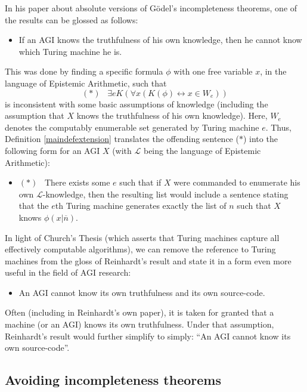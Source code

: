 \documentclass[runningheads]{llncs}
\begin{document}
In his paper \cite{reinhardt1986epistemic} about absolute versions of
G\"odel's incompleteness theorems, one of the results can be glossed as follows:
\begin{itemize}
  \item
  If an AGI knows the truthfulness of his own knowledge, then he cannot
  know which Turing machine he is.
\end{itemize}
This was done by finding a specific formula $\phi$ with one free variable $x$,
in the language of Epistemic Arithmetic,
such that
\[
  (*) \,\,\,\,\, \exists e K(\forall x (K(\phi)\leftrightarrow x\in W_e))
\]
is inconsistent with some basic assumptions of knowledge
(including the assumption that $X$ knows the truthfulness of his own knowledge).
Here, $W_e$ denotes the computably enumerable set generated by Turing machine $e$. Thus,
Definition \ref{maindefextension} translates the offending sentence ($*$) into the
following form
for an AGI $X$ (with $\mathscr L$ being the language of Epistemic Arithmetic):
\begin{itemize}
  \item
  $(*) \,\,\,\,\, $There exists some $e$ such that if $X$ were commanded to enumerate his own
  $\mathscr L$-knowledge, then the resulting list would include a sentence
  stating that the $e$th Turing machine generates exactly the list of $n$ such
  that $X$ knows $\phi(x|\overline n)$.
\end{itemize}

In light of Church's Thesis (which asserts that Turing machines capture all
effectively computable algorithms), we can remove the reference to Turing machines
from the gloss of Reinhardt's result and state it in a form even more useful
in the field of AGI research:
\begin{itemize}
  \item
  An AGI cannot know its own truthfulness and its own source-code.
\end{itemize}

Often (including in Reinhardt's own paper), it is taken for granted that
a machine (or an AGI) knows its own truthfulness.
Under that assumption, Reinhardt's result would further simplify to
simply: ``An AGI cannot know its own source-code''.

\subsection{Avoiding incompleteness theorems}
\end{document}
